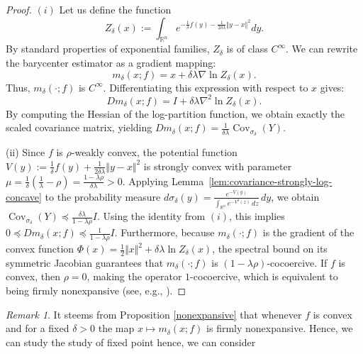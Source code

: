 \documentclass[11pt]{article}
\newcommand{\1}{\mathds{1}}
\theoremstyle{definition}
\theoremstyle{remark}
\newtheorem{remark}[theorem]{Remark}
\theoremstyle{definition}
\begin{document}
\begin{proof}
$(i)$ Let us define the function
\begin{equation}\label{def_Zdelta}
Z_{\delta}(x) := \int_{\mathbb{R}^n} e^{-\frac{1}{\delta}f(y) - \frac{1}{2\delta\lambda}\Vert y-x\Vert^2} dy.
\end{equation}
 By standard properties of exponential families, \(Z_{\delta}\) is of class \(C^\infty\). We can rewrite the barycenter estimator as a gradient mapping:
\begin{equation}\label{Identitymdelta}
m_\delta(x;f) = x + \delta\lambda \nabla \ln Z_\delta(x).
\end{equation}
Thus, \(m_\delta(\cdot;f)\) is \(C^\infty\). Differentiating this expression with respect to \(x\) gives:
\[
Dm_\delta(x;f) = I + \delta\lambda \nabla^2 \ln Z_\delta(x).
\]
By computing the Hessian of the log-partition function, we obtain exactly the scaled covariance matrix, yielding \(Dm_\delta(x;f) = \frac{1}{\delta\lambda} \operatorname{Cov}_{\sigma_\delta}(Y)\).

(ii) Since \(f\) is \(\rho\)-weakly convex, the potential function \(V(y) := \frac{1}{\delta}f(y) + \frac{1}{2\delta\lambda}\Vert y-x\Vert^2\) is strongly convex with parameter \(\mu = \frac{1}{\delta}(\frac{1}{\lambda} - \rho) = \frac{1-\lambda\rho}{\delta\lambda} > 0\). Applying Lemma~\ref{lem:covariance-strongly-log-concave} to the probability 
measure $d\sigma_\delta(y)
=
\frac{e^{-V(y)}}{\int_{\mathbb R^n}e^{-V^\delta(z)}\,dz}\,dy$,  we obtain $\operatorname{Cov}_{\sigma_\delta}(Y)
\preceq
\frac{\delta\lambda}{1-\lambda\rho} I$.  Using the identity from $(i)$, this implies \(0 \preceq Dm_\delta(x;f) \preceq \frac{1}{1-\lambda\rho}I\). Furthermore, because \(m_\delta(\cdot;f)\) is the gradient of the convex function \(\Phi(x) = \frac{1}{2}\Vert x\Vert^2 + \delta\lambda \ln Z_\delta(x)\), the spectral bound on its symmetric Jacobian guarantees that \(m_\delta(\cdot;f)\) is \((1-\lambda\rho)\)-cocoercive. If \(f\) is convex, then \(\rho=0\), making the operator \(1\)-cocoercive, which is equivalent to being firmly nonexpansive (see, e.g., \cite[Proposition 4.4]{MR3616647}).
\end{proof}

\begin{remark}
It steems from Proposition \ref{nonexpansive} that whenever $f$ is convex and for a fixed $\delta>0$ the map $x\mapsto m_{\delta}(x;f)$ is firmly nonexpansive. Hence, we can study the study of fixed point  hence, we can consider 
\end{remark}
\end{document}
